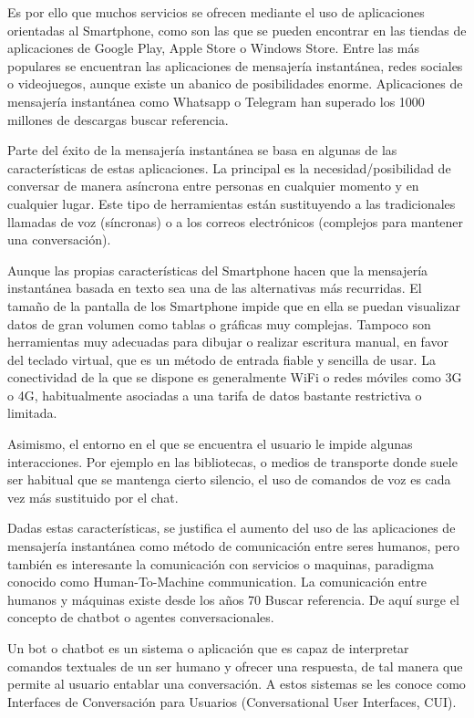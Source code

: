 Es por ello que muchos servicios se ofrecen mediante el uso de aplicaciones orientadas al Smartphone, como son las que se pueden encontrar en las tiendas de aplicaciones de Google Play, Apple Store o Windows Store. Entre las más populares se encuentran las aplicaciones de mensajería instantánea, redes sociales o videojuegos, aunque existe un abanico de posibilidades enorme. Aplicaciones de mensajería instantánea como Whatsapp o Telegram han superado los 1000 millones de descargas {buscar referencia}.

Parte del éxito de la mensajería instantánea se basa en algunas de las características de estas aplicaciones. La principal es la necesidad/posibilidad de conversar de manera asíncrona entre personas en cualquier momento y en cualquier lugar. Este tipo de herramientas están sustituyendo a las tradicionales llamadas de voz (síncronas) o a los correos electrónicos (complejos para mantener una conversación).

Aunque las propias características del Smartphone hacen que la mensajería instantánea basada en texto sea una de las alternativas más recurridas. El tamaño de la pantalla de los Smartphone impide que en ella se puedan visualizar datos de gran volumen como tablas o gráficas muy complejas. Tampoco son herramientas muy adecuadas para dibujar o realizar escritura manual, en favor del teclado virtual, que es un método de entrada fiable y sencilla de usar. La conectividad de la que se dispone es generalmente WiFi o redes móviles como 3G o 4G, habitualmente asociadas a una tarifa de datos bastante restrictiva o limitada.

Asimismo, el entorno en el que se encuentra el usuario le impide algunas interacciones. Por ejemplo en las bibliotecas, o medios de transporte donde suele ser habitual que se mantenga cierto silencio, el uso de comandos de voz es cada vez más sustituido por el chat.

Dadas estas características, se justifica el aumento del uso de las aplicaciones de mensajería instantánea como método de comunicación entre seres humanos, pero también es interesante la comunicación con servicios o maquinas, paradigma conocido como Human-To-Machine communication. La comunicación entre humanos y máquinas existe desde los años 70 {Buscar referencia}. De aquí surge el concepto de chatbot o agentes conversacionales.

Un bot o chatbot es un sistema o aplicación que es capaz de interpretar comandos textuales de un ser humano y ofrecer una respuesta, de tal manera que permite al usuario entablar una conversación. A estos sistemas se les conoce como Interfaces de Conversación para Usuarios (Conversational User Interfaces, CUI).

